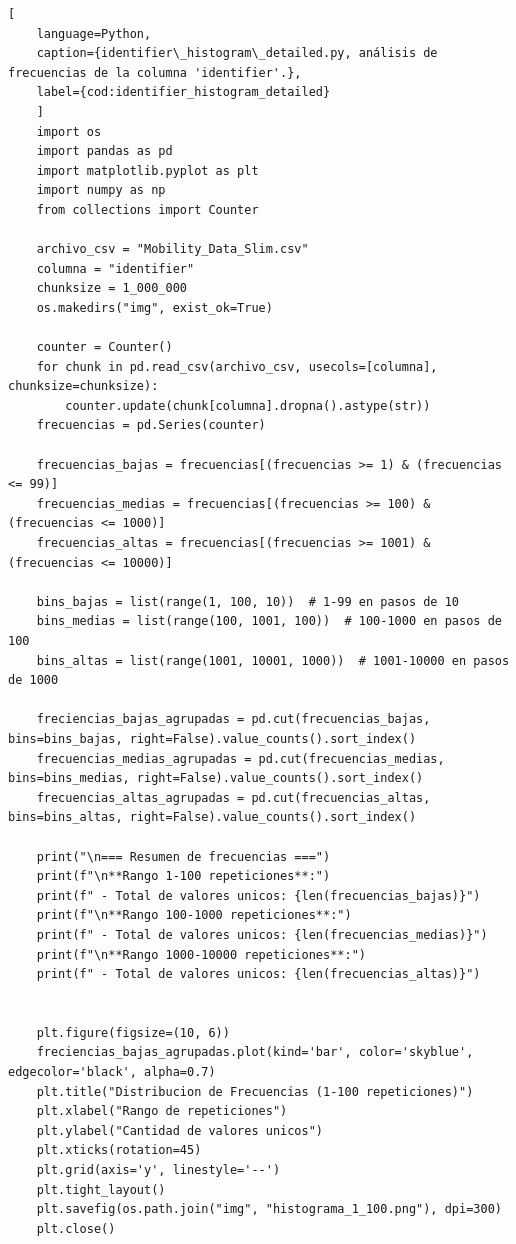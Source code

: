 \begin{lstlisting}[
    language=Python,
    caption={identifier\_histogram\_detailed.py, análisis de frecuencias de la columna 'identifier'.},
    label={cod:identifier_histogram_detailed}
    ]
    import os
    import pandas as pd
    import matplotlib.pyplot as plt
    import numpy as np
    from collections import Counter

    archivo_csv = "Mobility_Data_Slim.csv"
    columna = "identifier"  
    chunksize = 1_000_000  
    os.makedirs("img", exist_ok=True)

    counter = Counter()
    for chunk in pd.read_csv(archivo_csv, usecols=[columna], chunksize=chunksize):
        counter.update(chunk[columna].dropna().astype(str))
    frecuencias = pd.Series(counter)

    frecuencias_bajas = frecuencias[(frecuencias >= 1) & (frecuencias <= 99)]
    frecuencias_medias = frecuencias[(frecuencias >= 100) & (frecuencias <= 1000)]
    frecuencias_altas = frecuencias[(frecuencias >= 1001) & (frecuencias <= 10000)]

    bins_bajas = list(range(1, 100, 10))  # 1-99 en pasos de 10 
    bins_medias = list(range(100, 1001, 100))  # 100-1000 en pasos de 100
    bins_altas = list(range(1001, 10001, 1000))  # 1001-10000 en pasos de 1000

    freciencias_bajas_agrupadas = pd.cut(frecuencias_bajas, bins=bins_bajas, right=False).value_counts().sort_index()
    frecuencias_medias_agrupadas = pd.cut(frecuencias_medias, bins=bins_medias, right=False).value_counts().sort_index()
    frecuencias_altas_agrupadas = pd.cut(frecuencias_altas, bins=bins_altas, right=False).value_counts().sort_index()

    print("\n=== Resumen de frecuencias ===")
    print(f"\n**Rango 1-100 repeticiones**:")
    print(f" - Total de valores unicos: {len(frecuencias_bajas)}")
    print(f"\n**Rango 100-1000 repeticiones**:")
    print(f" - Total de valores unicos: {len(frecuencias_medias)}")
    print(f"\n**Rango 1000-10000 repeticiones**:")
    print(f" - Total de valores unicos: {len(frecuencias_altas)}")


    plt.figure(figsize=(10, 6))
    freciencias_bajas_agrupadas.plot(kind='bar', color='skyblue', edgecolor='black', alpha=0.7)
    plt.title("Distribucion de Frecuencias (1-100 repeticiones)")
    plt.xlabel("Rango de repeticiones")
    plt.ylabel("Cantidad de valores unicos")
    plt.xticks(rotation=45)
    plt.grid(axis='y', linestyle='--')
    plt.tight_layout()
    plt.savefig(os.path.join("img", "histograma_1_100.png"), dpi=300)
    plt.close()


\end{lstlisting}
